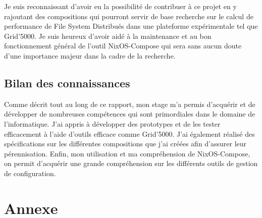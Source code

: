\documentclass[a4paper,french,12pt, titlepage]{article}
\begin{document}
Je suis reconnaissant d'avoir eu la possibilité de contribuer à ce
projet en y rajoutant des compositions qui pourront servir de base
recherche sur le calcul de performance de File System Distribués dans
une plateforme expérimentale tel que Grid'5000. Je suis heureux d'avoir
aidé à la maintenance et au bon fonctionnement général de l'outil
NixOS-Compose qui sera sans aucun doute d'une importance majeur dans la
cadre de la recherche.

\hypertarget{bilan-des-connaissances}{%
\subsection{Bilan des connaissances}\label{bilan-des-connaissances}}

Comme décrit tout au long de ce rapport, mon stage m'a permis d'acquérir
et de développer de nombreuses compétences qui sont primordiales dans le
domaine de l'informatique. J'ai appris à développer des prototypes et de
les tester efficacement à l'aide d'outils efficace comme Grid'5000. J'ai
également réalisé des spécifications sur les différentes compositions
que j'ai créées afin d'assurer leur pérennisation. Enfin, mon
utilisation et ma compréhension de NixOS-Compose, on permit d'acquérir
une grande compréhension sur les différents outils de gestion de
configuration.

\newpage

\hypertarget{annexe}{%
\section{Annexe}\label{annexe}}

\printbibliography

\printglossaries

\newpage
\end{document}
